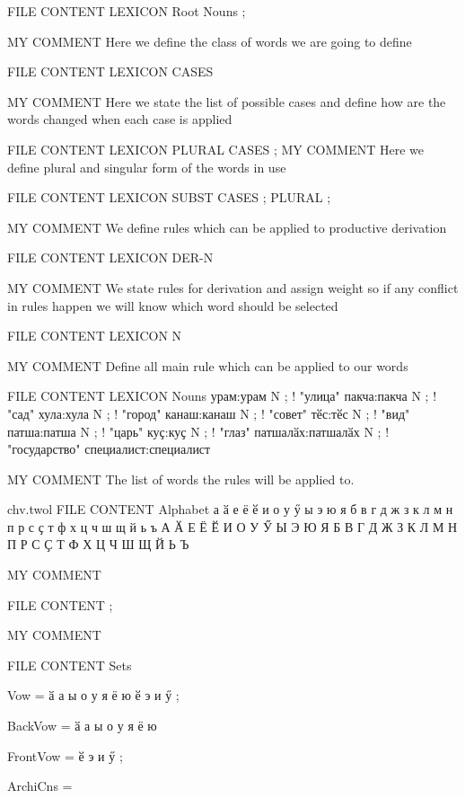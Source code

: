 \documentclass{article}
\begin{document}
FILE CONTENT
LEXICON Root
Nouns ;

MY COMMENT
Here we define the class of words we are going to define

FILE CONTENT
LEXICON CASES 

MY COMMENT
Here we state the list of possible cases and define how are the words changed when each case is applied

FILE CONTENT
LEXICON PLURAL
                 CASES ;
MY COMMENT
Here we define plural and singular form of the words in use

FILE CONTENT
LEXICON SUBST 
CASES ;
PLURAL ;

MY COMMENT
We define rules which can be applied to productive derivation

FILE CONTENT
LEXICON DER-N

MY COMMENT
We state rules for derivation and assign weight so if any conflict in rules happen we will know which word should be selected

FILE CONTENT
LEXICON N

MY COMMENT
Define all main rule which can be applied to our words

FILE CONTENT
LEXICON Nouns
урам:урам N ;     ! "улица"
пакча:пакча N ;   ! "сад"
хула:хула N ;     ! "город"
канаш:канаш N ;   ! "совет"
тӗс:тӗс N ;       ! "вид"
патша:патша N ;   ! "царь"
куҫ:куҫ N ;       ! "глаз"
патшалӑх:патшалӑх N ; ! "государство"
специалист:специалист%

MY COMMENT
The list of words the rules will be applied to.

chv.twol
FILE CONTENT
 Alphabet
  а ӑ е ё ӗ и о у ӳ ы э ю я б в г д ж з к л м н п р с ҫ т ф х ц ч ш щ й ь ъ
  А Ӑ Е Ё Ӗ И О У Ӳ Ы Э Ю Я Б В Г Д Ж З К Л М Н П Р С Ҫ Т Ф Х Ц Ч Ш Щ Й Ь Ъ

MY COMMENT 

FILE CONTENT  
;

MY COMMENT

FILE CONTENT  
Sets
 
Vow = ӑ а ы о у я ё ю ӗ э и ӳ ;
 
BackVow = ӑ а ы о у я ё ю %
 
FrontVow = ӗ э и ӳ ;
 
ArchiCns = %
 
\end{document}

